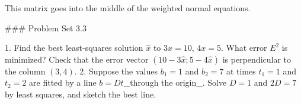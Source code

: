 This matrix goes into the middle of the weighted normal equations.

### Problem Set 3.3

1. Find the best least-squares solution \(\widehat{x}\) to \(3x=10\), \(4x=5\). What error \(E^{2}\) is minimized? Check that the error vector \((10-3\widehat{x};5-4\widehat{x})\) is perpendicular to the column \((3,4)\).
2. Suppose the values \(b_{1}=1\) and \(b_{2}=7\) at times \(t_{1}=1\) and \(t_{2}=2\) are fitted by a line \(b=Dt\)_through the origin_. Solve \(D=1\) and \(2D=7\) by least squares, and sketch the best line.

 